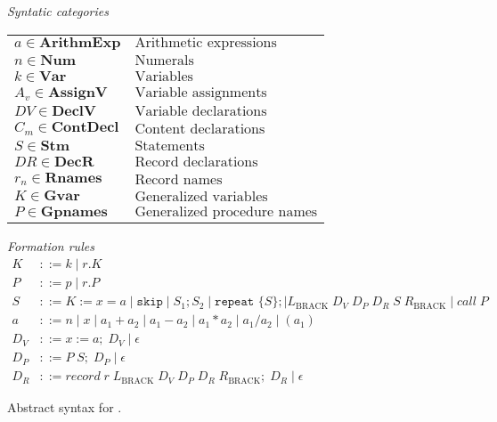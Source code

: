\begin{figure}[h]
	\centering
	\textit{Syntatic categories}
	\vspace{4mm}


	\begin{tabular}{l l}
		$a \in \textbf{ArithmExp}$ & $\text{Arithmetic expressions}$ \\ 
		$n \in \textbf{Num}$ & $\text{Numerals}$ \\
		$k \in \textbf{Var}$ & $\text{Variables}$ \\
		$A_v \in \textbf{AssignV}$ & $\text{Variable assignments}$ \\
		$DV \in \textbf{DeclV}$ & $\text{Variable declarations}$ \\
		$C_m \in \textbf{ContDecl}$ & $\text{Content declarations}$ \\
		$S \in \textbf{Stm}$ & $\text{Statements}$\\
		$DR \in \textbf{DecR}$ & $\text{Record declarations}$\\
		$r_n \in \textbf{Rnames}$ & $\text{Record names}$ \\
		$K \in \textbf{Gvar}$ & $\text{Generalized variables}$\\
		$P \in \textbf{Gpnames}$ & $\text{Generalized procedure names}$
	\end{tabular}

	\vspace{4mm}
	\textit{Formation rules}
	\begin{align*}
		K&::=k\mid r.K \\
		P&::=p\mid r.P \\
		S&::=K:=x=a\mid \texttt{skip}\mid S_1;S_2\mid \texttt{repeat }\{S\}; \mid L_\text{BRACK} \; D_V \; D_P \; D_R \; S \; R_\text{BRACK}\mid call \; P\\
		a&::=n\mid x\mid a_1+a_2\mid a_1-a_2\mid a_1*a_2\mid a_1/a_2\mid (a_1) \\
		D_V&::= x:=a; \; D_V \mid \epsilon \\
		D_P&::= P \; S; \; D_P \mid \epsilon \\
		D_R&::= record \; r \; L_\text{BRACK} \; D_V \; D_P \; D_R \; R_\text{BRACK}; \; D_R \mid \epsilon
	\end{align*}

	\caption{Abstract syntax for \dazel{}.}
	\label{fig:AbstractSyntax}
\end{figure}

